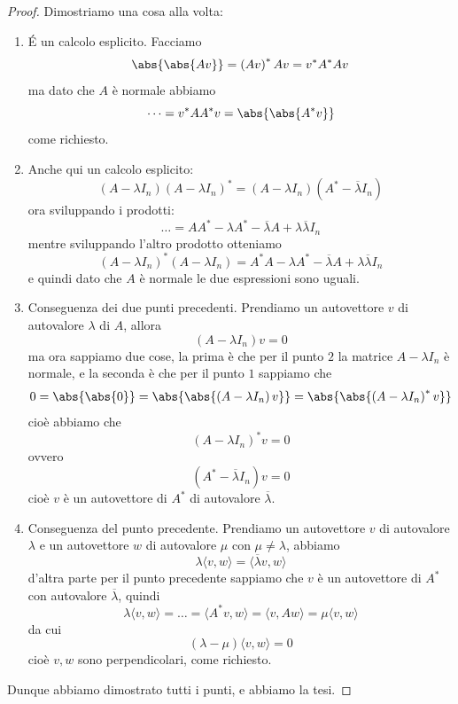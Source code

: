 \documentclass[11pt]{scrartcl}
\begin{document}
   	 \begin{proof}
   	 	Dimostriamo una cosa alla volta:
   	 	\begin{enumerate}
   	 		\item \'E un calcolo esplicito. Facciamo
   	 		$$\abs{\abs{Av}}=\left(Av\right)^*Av=v^*A^*Av$$
   	 		ma dato che $A$ è normale abbiamo
   	 		$$\dots=v^*AA^*v=\abs{\abs{A^*v}}$$
   	 		come richiesto.
   	 		\item Anche qui un calcolo esplicito:
   	 		$$\left(A-\lambda I_n\right)\left(A-\lambda I_n\right)^*=\left(A-\lambda I_n\right)\left(A^*-\overline{\lambda}I_n\right)$$
   	 		ora sviluppando i prodotti:
   	 		$$\dots=AA^*-\lambda A^*-\overline{\lambda}A+\lambda \overline{\lambda}I_n$$
   	 		mentre sviluppando l'altro prodotto otteniamo
   	 		$$\left(A-\lambda I_n\right)^*\left(A-\lambda I_n\right)=A^*A-\lambda A^*-\overline{\lambda}A+\lambda \overline{\lambda}I_n$$
   	 		e quindi dato che $A$ è normale le due espressioni sono uguali.
   	 		\item Conseguenza dei due punti precedenti. Prendiamo un autovettore $v$ di autovalore $\lambda$ di $A$, allora
   	 		$$\left(A-\lambda I_n\right)v=0$$
   	 		ma ora sappiamo due cose, la prima è che per il punto $2$ la matrice $A-\lambda I_n$ è normale, e la seconda è che per il punto $1$ sappiamo che
   	 		$$0=\abs{\abs{0}}=\abs{\abs{\left(A-\lambda I_n\right)v}}=\abs{\abs{\left(A-\lambda I_n\right)^*v}}$$
   	 		cioè abbiamo che 
   	 		$$\left(A-\lambda I_n\right)^*v=0$$
   	 		ovvero
   	 		$$\left(A^*-\overline{\lambda}I_n\right)v=0$$
   	 		cioè $v$ è un autovettore di $A^*$ di autovalore $\overline{\lambda}$.
   	 		\item Conseguenza del punto precedente. Prendiamo un autovettore $v$ di autovalore $\lambda$ e un autovettore $w$ di autovalore $\mu$ con $\mu\ne \lambda$, abbiamo
   	 		$$\lambda \langle v,w\rangle = \langle \overline{\lambda}v,w\rangle$$
   	 		d'altra parte per il punto precedente sappiamo che $v$ è un autovettore di $A^*$ con autovalore $\overline{\lambda}$, quindi
   	 		$$\lambda\langle v,w\rangle=\dots = \langle A^*v,w\rangle= \langle v,Aw\rangle=\mu \langle v,w\rangle$$
   	 		da cui
   	 		$$(\lambda-\mu)\langle v,w\rangle=0$$
   	 		cioè $v,w$ sono perpendicolari, come richiesto.
   	 	\end{enumerate}
   	 	Dunque abbiamo dimostrato tutti i punti, e abbiamo la tesi.
   	 \end{proof}
   	 
   	 \newpage
   	 
\end{document}
